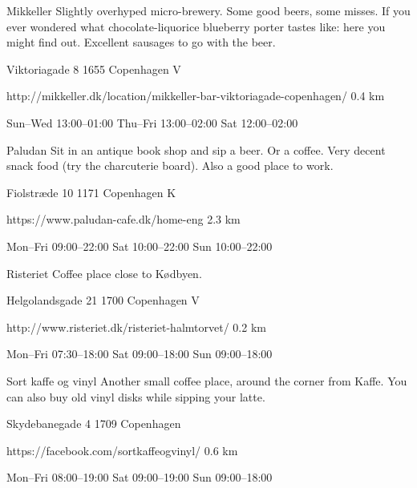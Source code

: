 \begin{left}
\begin{eventitem}
\begin{eventitem}
\begin{eventitem}
\begin{fooditem}
{Mikkeller}
{Slightly overhyped micro-brewery. Some good beers, some misses. If you ever wondered what chocolate-liquorice blueberry porter tastes like: here you might find out. Excellent sausages to go with the beer.}
{\begin{addr}
{Viktoriagade 8}
{1655 Copenhagen V}
\end{addr}}
{http://mikkeller.dk/location/mikkeller-bar-viktoriagade-copenhagen/}
{0.4 km}
{}
{\begin{ohours}
{Sun–Wed}
{13:00–01:00}
{Thu–Fri}
{13:00–02:00}
{Sat}
{12:00–02:00}
{}
{}
\end{ohours}}
\end{fooditem}
\begin{fooditem}
{Paludan}
{Sit in an antique book shop and sip a beer. Or a coffee. Very decent snack food (try the charcuterie board). Also a good place to work.}
{\begin{addr}
{Fiolstræde 10}
{1171 Copenhagen K}
\end{addr}}
{https://www.paludan-cafe.dk/home-eng}
{2.3 km}
{}
{\begin{ohours}
{Mon–Fri}
{09:00–22:00}
{​​Sat}
{10:00–22:00}
{​Sun}
{10:00–22:00}
{}
{}
\end{ohours}}
\end{fooditem}
\begin{fooditem}
{Risteriet}
{Coffee place close to Kødbyen.}
{\begin{addr}
{Helgolandsgade 21}
{1700 Copenhagen V}
\end{addr}}
{http://www.risteriet.dk/risteriet-halmtorvet/}
{0.2 km}
{}
{\begin{ohours}
{Mon–Fri}
{07:30–18:00}
{Sat}
{ 09:00–18:00}
{Sun}
{09:00–18:00}
{}
{}
\end{ohours}}
\end{fooditem}
\begin{fooditem}
{Sort kaffe og vinyl}
{Another small coffee place, around the corner from Kaffe. You can also buy old vinyl disks while sipping your latte.}
{\begin{addr}
{Skydebanegade 4}
{1709 Copenhagen}
\end{addr}}
{https://facebook.com/sortkaffeogvinyl/}
{0.6 km}
{}
{\begin{ohours}
{Mon–Fri}
{08:00–19:00}
{Sat}
{09:00–19:00}
{Sun}
{09:00–18:00}
{}
{}
\end{ohours}}
\end{fooditem}






\end{eventitem}
\end{eventitem}
\end{eventitem}
\end{left}
